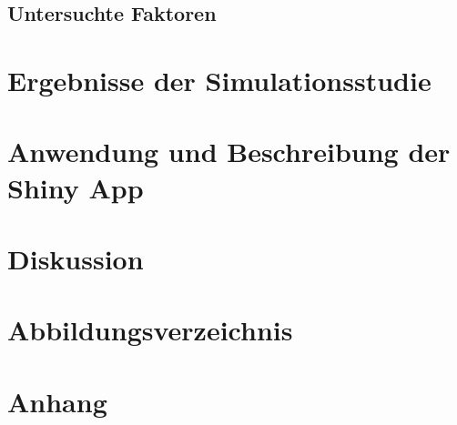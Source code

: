 \documentclass[12pt]{article}\usepackage[]{graphicx}\usepackage[]{color}
\begin{document}
\subsection{Untersuchte Faktoren}

\section{Ergebnisse der Simulationsstudie}
\section{Anwendung und Beschreibung der Shiny App}
\section{Diskussion}
\newpage



\section{Abbildungsverzeichnis}
\section{Anhang}
\end{document}
